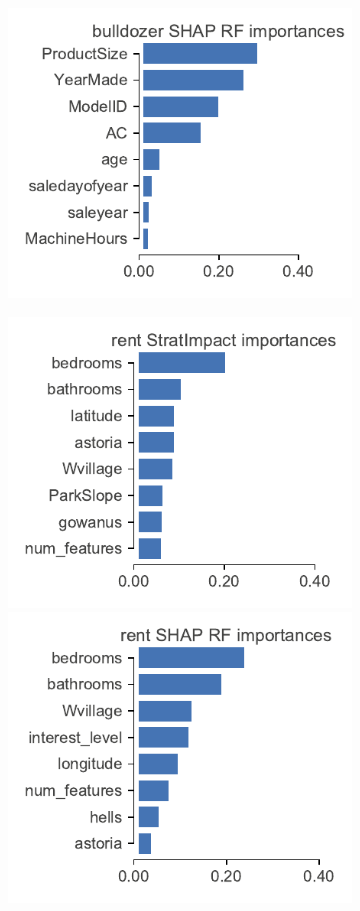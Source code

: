 \documentclass[twoside,11pt]{article}
\begin{document}
\begin{figure}
\begin{subfigure}{1\textwidth}
\includegraphics[scale=0.6]{images/bulldozer-features-shap-rf.pdf}
\vspace{-2mm}\vspace{3mm}
\end{subfigure}%
\hfill
\begin{subfigure}{1\textwidth}
    \centering
\includegraphics[scale=0.6]{images/rent-features.pdf}
\includegraphics[scale=0.6]{images/rent-features-shap-rf.pdf}

\end{subfigure}
\end{figure}
\end{document}
